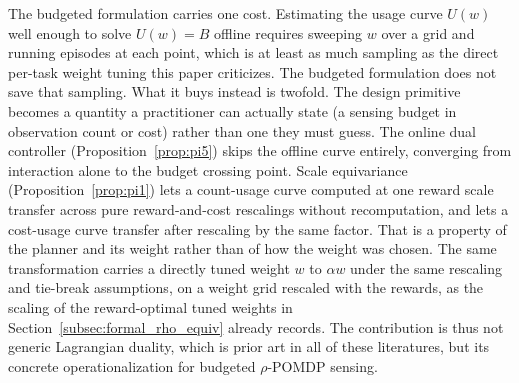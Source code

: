The budgeted formulation carries one cost. Estimating the usage curve $U(w)$ well enough to solve $U(w){=}B$ offline requires sweeping $w$ over a grid and running episodes at each point, which is at least as much sampling as the direct per-task weight tuning this paper criticizes. The budgeted formulation does not save that sampling. What it buys instead is twofold. The design primitive becomes a quantity a practitioner can actually state (a sensing budget in observation count or cost) rather than one they must guess. The online dual controller (Proposition~\ref{prop:pi5}) skips the offline curve entirely, converging from interaction alone to the budget crossing point. Scale equivariance (Proposition~\ref{prop:pi1}) lets a count-usage curve computed at one reward scale transfer across pure reward-and-cost rescalings without recomputation, and lets a cost-usage curve transfer after rescaling by the same factor. That is a property of the planner and its weight rather than of how the weight was chosen. The same transformation carries a directly tuned weight $w$ to $\alpha w$ under the same rescaling and tie-break assumptions, on a weight grid rescaled with the rewards, as the scaling of the reward-optimal tuned weights in Section~\ref{subsec:formal_rho_equiv} already records. The contribution is thus not generic Lagrangian duality, which is prior art in all of these literatures, but its concrete operationalization for budgeted $\rho$-POMDP sensing.
